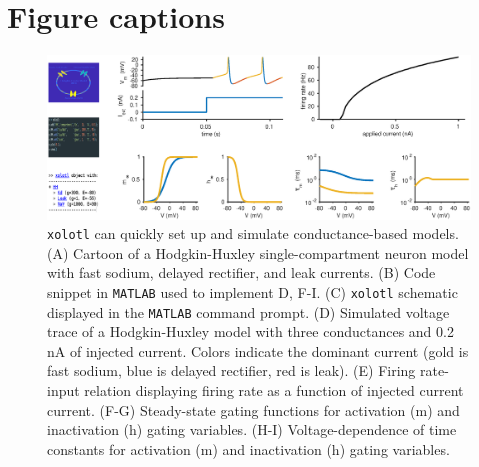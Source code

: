 \documentclass{frontiersSCNS} %
\begin{document}
%
%
%
%
%
%


\section*{Figure captions}

\FloatBarrier

\begin{figure}
	\centering
	\includegraphics[width=1.0\linewidth]{gfx/figure_HH}
	\caption{\texttt{xolotl} can quickly set up and simulate conductance-based models. (A) Cartoon of a Hodgkin-Huxley single-compartment neuron model with fast sodium, delayed rectifier, and leak currents. (B) Code snippet in \texttt{MATLAB} used to implement D, F-I. (C) \texttt{xolotl} schematic displayed in the \texttt{MATLAB} command prompt. (D) Simulated voltage trace of a Hodgkin-Huxley model with three conductances and 0.2 nA of injected current. Colors indicate the dominant current (gold is fast sodium, blue is delayed rectifier, red is leak). (E) Firing rate-input relation displaying firing rate as a function of injected current current. (F-G) Steady-state gating functions for activation (m) and inactivation (h) gating variables. (H-I) Voltage-dependence of time constants for activation (m) and inactivation (h) gating variables.}
	\label{fig:figurehh}
\end{figure}
\end{document}
